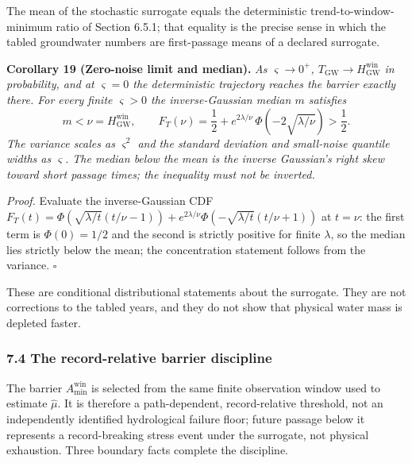 \documentclass[11pt]{article}
\begin{document}
The mean of the stochastic surrogate equals the deterministic
trend-to-window-minimum ratio of Section 6.5.1; that equality is the
precise sense in which the tabled groundwater numbers are first-passage
means of a declared surrogate.

\textbf{Corollary 19 (Zero-noise limit and median).} \emph{As
\(\varsigma \to 0^+\),
\(T_{\mathrm{GW}} \to H^{\mathrm{win}}_{\mathrm{GW}}\) in probability,
and at \(\varsigma = 0\) the deterministic trajectory reaches the
barrier exactly there. For every finite \(\varsigma > 0\) the
inverse-Gaussian median \(m\) satisfies}
\[m < \nu = H^{\mathrm{win}}_{\mathrm{GW}}, \qquad F_T(\nu) = \frac{1}{2} + e^{2\lambda/\nu}\,\Phi\!\left( -2\sqrt{\lambda/\nu} \right) > \frac{1}{2}.\]
\emph{The variance scales as \(\varsigma^2\) and the standard deviation
and small-noise quantile widths as \(\varsigma\). The median below the
mean is the inverse Gaussian's right skew toward short passage times;
the inequality must not be inverted.}

\emph{Proof.} Evaluate the inverse-Gaussian CDF
\(F_T(t) = \Phi(\sqrt{\lambda/t}(t/\nu - 1)) + e^{2\lambda/\nu}\Phi(-\sqrt{\lambda/t}(t/\nu + 1))\)
at \(t = \nu\): the first term is \(\Phi(0) = 1/2\) and the second is
strictly positive for finite \(\lambda\), so the median lies strictly
below the mean; the concentration statement follows from the variance. \ensuremath{\square}

These are conditional distributional statements about the surrogate.
They are not corrections to the tabled years, and they do not show that
physical water mass is depleted faster.

\subsubsection{7.4 The record-relative barrier
discipline}\label{the-record-relative-barrier-discipline}

The barrier \(A_{\min}^{\mathrm{win}}\) is selected from the same finite
observation window used to estimate \(\widehat\mu\). It is therefore a
path-dependent, record-relative threshold, not an independently
identified hydrological failure floor; future passage below it
represents a record-breaking stress event under the surrogate, not
physical exhaustion. Three boundary facts complete the discipline.
\end{document}
